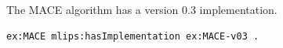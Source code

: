 The MACE algorithm has a version 0.3 implementation.
\begin{lstlisting}[language=turtle]
ex:MACE mlips:hasImplementation ex:MACE-v03 .
\end{lstlisting}
